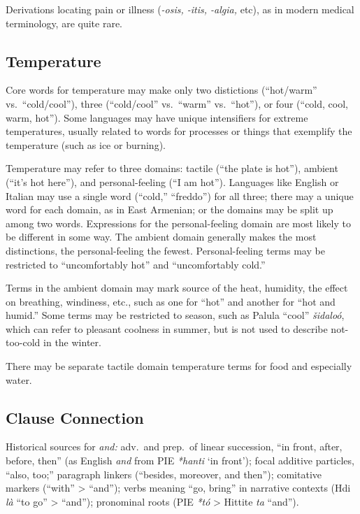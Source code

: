 \documentclass[11pt]{article}
\begin{document}
Derivations locating pain or illness (\textit{-osis, -itis, -algia,}
etc), as in modern medical terminology, are quite rare.

\subsection{Temperature}
Core words for temperature may make only two distictions (``hot/warm''
vs.\ ``cold/cool''), three (``cold/cool'' vs.\ ``warm'' vs.\ ``hot''),
or four (``cold, cool, warm, hot''). Some languages may have unique
intensifiers for extreme temperatures, usually related to words for
processes or things that exemplify the temperature (such as ice or
burning).

Temperature may refer to three domains: tactile (``the plate is
hot''), ambient (``it's hot here''), and personal-feeling (``I am
hot'').  Languages like English or Italian may use a single word
(``cold,'' ``freddo'') for all three; there may a unique word for each
domain, as in East Armenian; or the domains may be split up among two
words.  Expressions for the personal-feeling domain are most likely to
be different in some way.  The ambient domain generally makes the most
distinctions, the personal-feeling the fewest.  Personal-feeling terms
may be restricted to ``uncomfortably hot'' and ``uncomfortably cold.''

Terms in the ambient domain may mark source of the heat, humidity, the
effect on breathing, windiness, etc., such as one for ``hot'' and
another for ``hot and humid.''  Some terms may be restricted to
season, such as Palula ``cool'' \textit{šidaloó}, which can refer to
pleasant coolness in summer, but is not used to describe not-too-cold
in the winter.

There may be separate tactile domain temperature terms for food and
especially water.

\subsection{Clause Connection}
Historical sources for \textit{and:} adv.\ and prep.\ of linear
succession, ``in front, after, before, then'' (as English \textit{and}
from PIE \textit{*hanti} `in front'); focal additive particles, ``also,
too;'' paragraph linkers (``besides, moreover, and then''); comitative
markers (``with'' > ``and''); verbs meaning ``go, bring'' in narrative
contexts (Hdi \textit{là} ``to go'' > ``and''); pronominal roots (PIE
\textit{*tó} > Hittite \textit{ta} ``and'').
\end{document}
